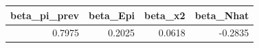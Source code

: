 \begin{tabular}{rrrr}
\toprule
beta_pi_prev & beta_Epi & beta_x2 & beta_Nhat \\
\midrule
0.7975 & 0.2025 & 0.0618 & -0.2835 \\
\bottomrule
\end{tabular}

